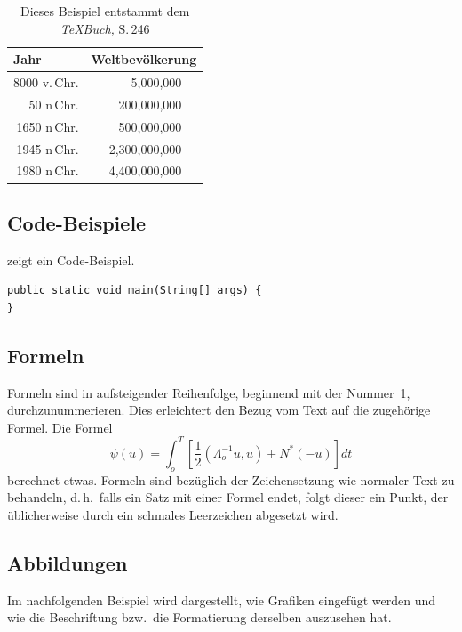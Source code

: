 \documentclass[runningheads,a4paper]{llncs}[2015/06/24]
\begin{document}
\begin{table}
\caption{Dieses Beispiel entstammt dem {\it\TeX{}Buch,} S.\,246}
\label{tab:bsp}
\begin{center}
\begin{tabular}{r@{\quad}rl}
\hline
\multicolumn{1}{l}{\rule{0pt}{12pt}
                   Jahr}&\multicolumn{2}{l}{Weltbevölkerung}\\[2pt]
\hline\rule{0pt}{12pt}
8000 v.\,Chr. &     5,000,000& \\
  50 n\,Chr. &   200,000,000& \\
1650 n\,Chr. &   500,000,000& \\
1945 n\,Chr. & 2,300,000,000& \\
1980 n\,Chr. & 4,400,000,000& \\[2pt]
\hline
\end{tabular}
\end{center}
\end{table}

\subsection{Code-Beispiele}

 zeigt ein Code-Beispiel.

\begin{lstlisting}[float,caption=A floating example,label=lst:example]
public static void main(String[] args) {
}
\end{lstlisting}

\subsection{Formeln}
Formeln sind in aufsteigender Reihenfolge, beginnend mit der Nummer~1, durchzunummerieren.
Dies erleichtert den Bezug vom Text auf die zugehörige Formel.
Die Formel
%
\begin{equation}
  \psi (u) = \int_{o}^{T} \left[\frac{1}{2}
  \left(\Lambda_{o}^{-1} u,u\right) + N^{\ast} (-u)\right] dt
\end{equation}
%
berechnet etwas.
Formeln sind bezüglich der Zeichensetzung wie normaler Text zu behandeln, d.\,h.\ falls ein Satz mit einer Formel endet, folgt dieser ein Punkt, der üblicherweise durch ein schmales Leerzeichen abgesetzt wird.

\subsection{Abbildungen}
Im nachfolgenden Beispiel wird dargestellt, wie Grafiken eingefügt werden und wie die Beschriftung bzw.\ die Formatierung derselben auszusehen hat.
\end{document}
